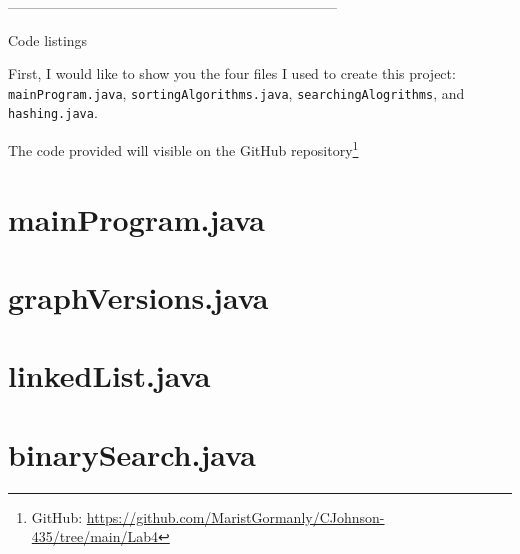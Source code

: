 \documentclass{article}
\begin{document}
\begin{center}
    -----------------------------------------------------------------------
\end{center}

\begin{center}
\begin{large}
    Code listings
\end{large}
\end{center}


First, I would like to show you the four files I used to create this project: \verb|mainProgram.java|, \verb|sortingAlgorithms.java|, \verb|searchingAlogrithms|, and \verb|hashing.java|. 

\begin{footnotesize}
The code provided will visible on the GitHub repository\footnote{GitHub: \url{https://github.com/MaristGormanly/CJohnson-435/tree/main/Lab4}} 
\end{footnotesize}

\section {\Large {mainProgram.java}}

   




\section {\Large {graphVersions.java}}

   





\section {\Large {linkedList.java}}

   





\section {\Large {binarySearch.java}}

   
\end{document}
